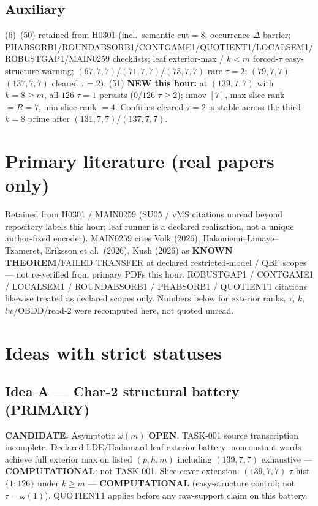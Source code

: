 \documentclass[11pt]{article}
\begin{document}
\subsection*{Auxiliary}
(6)--(50) retained from H0301 (incl.\ semantic-cut$=8$; occurrence-$\Delta$ barrier;
PHABSORB1/ROUNDABSORB1/CONTGAME1/QUOTIENT1/LOCALSEM1/ROBUSTGAP1/MAIN0259 checklists;
leaf exterior-max / $k{<}m$ forced-$\tau$ easy-structure warning;
$(67,7,7)$/$(71,7,7)$/$(73,7,7)$ rare $\tau{=}2$; $(79,7,7)$--$(137,7,7)$ cleared $\tau{=}2$).
(51) \textbf{NEW this hour:} at $(139,7,7)$ with $k{=}8{\ge}m$, all-$126$ $\tau{=}1$ persists
($0/126$ $\tau{\ge}2$); innov $[7]$, max slice-rank $=R{=}7$, min slice-rank $=4$.
Confirms cleared-$\tau{=}2$ is stable across the third $k{=}8$ prime after $(131,7,7)$/$(137,7,7)$.

\section*{Primary literature (real papers only)}
Retained from H0301 / MAIN0259 (SU05 / vMS citations unread beyond repository labels this hour;
leaf runner is a declared realization, not a unique author-fixed encoder).
MAIN0259 cites Volk (2026), Hakoniemi--Limaye--Tzameret, Eriksson et al.\ (2026), Kush (2026)
as \textbf{KNOWN THEOREM}/FAILED TRANSFER at declared restricted-model / QBF scopes ---
not re-verified from primary PDFs this hour.
ROBUSTGAP1 / CONTGAME1 / LOCALSEM1 / ROUNDABSORB1 / PHABSORB1 / QUOTIENT1 citations likewise
treated as declared scopes only.
Numbers below for exterior ranks, $\tau$, $k$, $lw$/OBDD/read-$2$
were recomputed here, not quoted unread.

\section*{Ideas with strict statuses}
\subsection*{Idea A --- Char-2 structural battery (PRIMARY)}
\textbf{CANDIDATE.} Asymptotic $\omega(m)$ \textbf{OPEN}. TASK-001 source transcription incomplete.
Declared LDE/Hadamard leaf exterior battery: nonconstant words achieve full exterior max on
listed $(p,h,m)$ including $(139,7,7)$ exhaustive --- \textbf{COMPUTATIONAL}; not TASK-001.
Slice-cover extension: $(139,7,7)$ $\tau$-hist $\{1{:}126\}$ under $k{\ge}m$ ---
\textbf{COMPUTATIONAL} (easy-structure control; not $\tau=\omega(1)$).
QUOTIENT1 applies before any raw-support claim on this battery.
\end{document}

